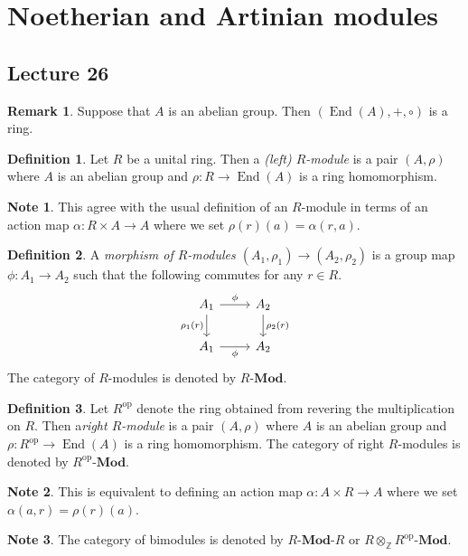 \documentclass[10pt,letterpaper,cm]{nupset}
\theoremstyle{definition}
\newtheorem*{definition}{Definition}
\newtheorem{note}{Note}
\newtheorem{remark}{Remark}
\newcommand{\Z}{\mathbb Z}
\newcommand{\1}{\mathbf{1}}
\newcommand{\0}{\vec 0}
\DeclareMathOperator{\op}{op}
\DeclareMathOperator{\ed}{End}
\begin{document}
\section{Noetherian and Artinian modules}

\subsection{Lecture 26}

\begin{remark}
Suppose that $A$ is an abelian group. Then $(\ed(A), +, \circ)$ is a ring. 
\end{remark}

\begin{definition}
Let $R$ be a unital ring. Then a \textit{(left) $R$-module} is a pair $(A, \rho)$ where $A$ is an abelian group and $\rho : R \to \ed(A)$ is a ring homomorphism.
\end{definition}
\begin{note}
This agree with the usual definition of an $R$-module in terms of an action map $\alpha : R\times A \to A$ where we set $\rho(r)(a) = \alpha(r, a)$.
\end{note}

\begin{definition}
A \textit{morphism of $R$-modules $(A_1, \rho_1) \to (A_2, \rho_2)$} is a group map $\phi : A_1 \to A_2$ such that the following commutes for any $r\in R$.
\[
\begin{tikzcd}
A_1 \arrow[d, "\rho_1(r)"'] \arrow[r, "\phi"] & A_2 \arrow[d, "\rho_2(r)"] \\
A_1 \arrow[r, "\phi"'] & A_2
\end{tikzcd}
\] The category of $R$-modules is denoted by $R$-$\mathbf{Mod}$.
\end{definition}

\begin{definition}
Let $R^{\op}$ denote the ring obtained from revering the multiplication on $R$. Then a\textit{right $R$-module} is a pair $(A, \rho)$ where $A$ is an abelian group and $\rho : R^{\op} \to \ed(A)$ is a ring homomorphism. The category of right $R$-modules is denoted by $R^{\op}$-$\mathbf{Mod}$.
\begin{note}
This is equivalent to defining an action map $\alpha : A \times R \to A$ where we set $\alpha(a, r) = \rho(r)(a)$.
\end{note}
\end{definition}

\begin{note}
The category of bimodules is denoted by $R$-$\mathbf{Mod}$-$R$ or $R \otimes_{\Z}R^{\op}$-$\mathbf{Mod}$.
\end{note}
\end{document}
